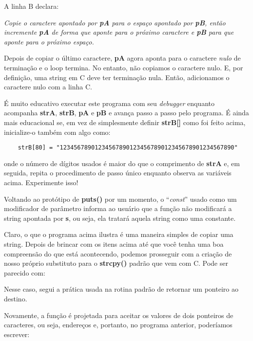 A linha B declara: 

\textit{Copie o caractere apontado por \textbf{pA} para o espaço apontado por \textbf{pB}, então incremente \textbf{pA} de forma que aponte para o próximo caractere e \textbf{pB} para que aponte para o próximo espaço.}

Depois de copiar o último caractere, \textbf{pA} agora aponta para o caractere \textit{nulo} de terminação e o loop termina. No entanto, não copiamos o caractere nulo. E, por definição, uma string em C deve ter terminação nula. Então, adicionamos o caractere nulo com a linha C.

É muito educativo executar este programa com seu \textit{debugger} enquanto acompanha \textbf{strA}, \textbf{strB}, \textbf{pA} e \textbf{pB} e avança passo a passo pelo programa. É ainda mais educacional se, em vez de simplesmente definir \textbf{strB[]} como foi feito acima, inicialize-o também com algo como:

\begin{lstlisting}
	strB[80] = "12345678901234567890123456789012345678901234567890"
\end{lstlisting}
onde o número de dígitos usados é maior do que o comprimento de \textbf{strA} e, em seguida, repita o procedimento de passo único enquanto observa as variáveis acima. Experimente isso!

Voltando ao protótipo de \textbf{puts()} por um momento, o ``\textit{const}'' usado como um modificador de parâmetro informa ao usuário que a função não modificará a string apontada por \textbf{s}, ou seja, ela tratará aquela string como uma constante.

Claro, o que o programa acima ilustra é uma maneira simples de copiar uma string. Depois de brincar com os itens acima até que você tenha uma boa compreensão do que está acontecendo, podemos prosseguir com a criação de nosso próprio substituto para o \textbf{strcpy()} padrão que vem com C. Pode ser parecido com:


Nesse caso, segui a prática usada na rotina padrão de retornar um ponteiro ao destino.

Novamente, a função é projetada para aceitar os valores de dois ponteiros de caracteres, ou seja, endereços e, portanto, no programa anterior, poderíamos escrever:


